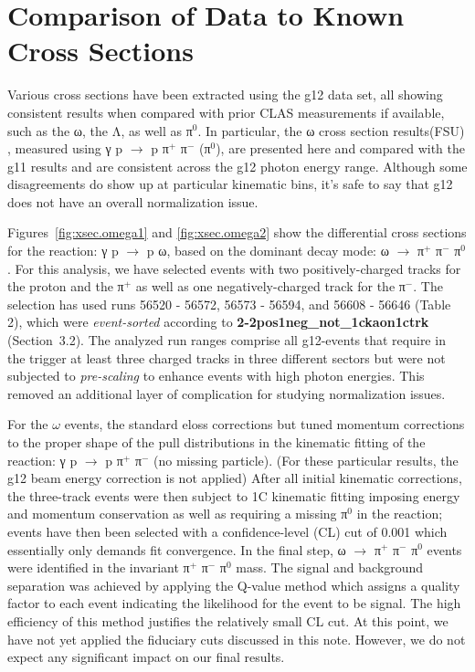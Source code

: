 \section{\label{sec:xsec}Comparison of Data to Known Cross Sections}

Various cross sections have been extracted using the g12 data set, all showing consistent results when compared with prior CLAS measurements if available, such as the ω, the Λ, as well as π$^0$. In particular, the ω cross section results(FSU) , measured using γ p $\rightarrow$ p π$^+$ π$^-$ (π$^0$), are presented here and compared with the g11 results and are consistent across the g12 photon energy range. Although some disagreements do show up at particular kinematic bins, it's safe to say that g12 does not have an overall normalization issue.

Figures~\ref{fig:xsec.omega1} and \ref{fig:xsec.omega2} show the differential cross sections for the reaction: γ p $\rightarrow$ p ω, based on the dominant decay mode: ω $\rightarrow$ π$^+$ π$^-$ π$^0$. For this analysis, we have selected events with two positively-charged tracks for the proton and the π$^+$ as well as one negatively-charged track for the π$^-$. The selection has used runs 56520 - 56572, 56573 - 56594, and 56608 - 56646 (Table 2), which were {\it event-sorted} according to {\bf 2-2pos1neg\_not\_1ckaon1ctrk} (Section~3.2). The analyzed run ranges comprise all g12-events that require in the trigger at least three charged tracks in three different sectors but were not subjected to {\it pre-scaling} to enhance events with high photon energies. This removed an additional layer of complication for studying normalization issues.

For the $\omega$ events, the standard {\sc eloss} corrections but tuned momentum corrections to the proper shape of the pull distributions in the kinematic fitting of the reaction: γ p $\rightarrow$ p π$^+$ π$^-$ (no missing particle). (For these particular results, the g12 beam energy correction is not applied) After all initial kinematic corrections, the three-track events were then subject to 1C kinematic fitting imposing energy and momentum conservation as well as requiring a missing π$^0$ in the reaction; events have then been selected with a confidence-level (CL) cut of 0.001 which essentially only demands fit convergence. In the final step, ω $\rightarrow$ π$^+$ π$^-$ π$^0$ events were identified in the invariant π$^+$ π$^-$ π$^0$ mass. The signal and background separation was achieved by applying the Q-value method which assigns a quality factor to each event indicating the likelihood for the event to be signal. The high efficiency of this method justifies the relatively small CL cut. At this point, we have not yet applied the fiduciary cuts discussed in this note. However, we do not expect any significant impact on our final results.

